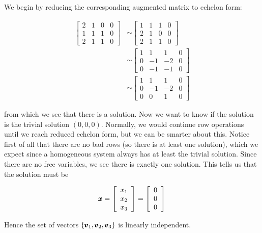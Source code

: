     \begin{solution}
        We begin by reducing the corresponding augmented matrix to echelon form:

\[
\begin{aligned}
{\left[\begin{array}{llll}
2 & 1 & 0 & 0 \\
1 & 1 & 1 & 0 \\
2 & 1 & 1 & 0
\end{array}\right] } & \sim\left[\begin{array}{llll}
1 & 1 & 1 & 0 \\
2 & 1 & 0 & 0 \\
2 & 1 & 1 & 0
\end{array}\right] \\
& \sim\left[\begin{array}{cccc}
1 & 1 & 1 & 0 \\
0 & -1 & -2 & 0 \\
0 & -1 & -1 & 0
\end{array}\right] \\
& \sim\left[\begin{array}{cccc}
1 & 1 & 1 & 0 \\
0 & -1 & -2 & 0 \\
0 & 0 & 1 & 0
\end{array}\right]
\end{aligned}
\]

from which we see that there is a solution. Now we want to know if the solution is the trivial solution $(0,0,0)$. Normally, we would continue row operations until we reach reduced echelon form, but we can be smarter about this. Notice first of all that there are no bad rows (so there is at least one solution), which we expect since a homogeneous system always has at least the trivial solution. Since there are no free variables, we see there is exactly one solution. This tells us that the solution must be

\[
\pmb{x}=\left[\begin{array}{l}
x_1 \\
x_2 \\
x_3
\end{array}\right]=\left[\begin{array}{l}
0 \\
0 \\
0
\end{array}\right]
\]

Hence the set of vectors $\left\{\pmb{v}_1, \pmb{v}_2, \pmb{v}_3\right\}$ is linearly independent.
\end{solution}

